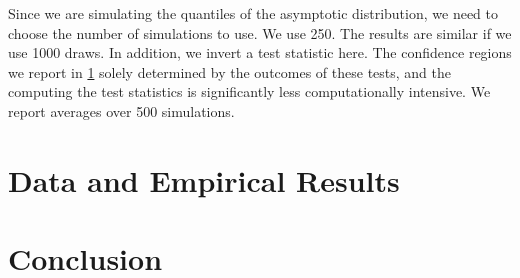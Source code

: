 \documentclass[11pt, letterpaper, twoside, final]{article}
\begin{document}
Since we are simulating the quantiles of the asymptotic distribution, we need to choose the number of simulations to use. We use \num{250}. The results are similar if we use \num{1000} draws. In addition, we invert a test statistic here. The confidence regions we report in \cref{sec:empirics} solely determined by the outcomes of these tests, and the computing the test statistics is significantly less computationally intensive.
We report averages over \num{500} simulations.








\section{Data and Empirical Results}\label{sec:empirics}

\section{Conclusion}

\newpage

{}
\printbibliography
\newpage
\end{document}
